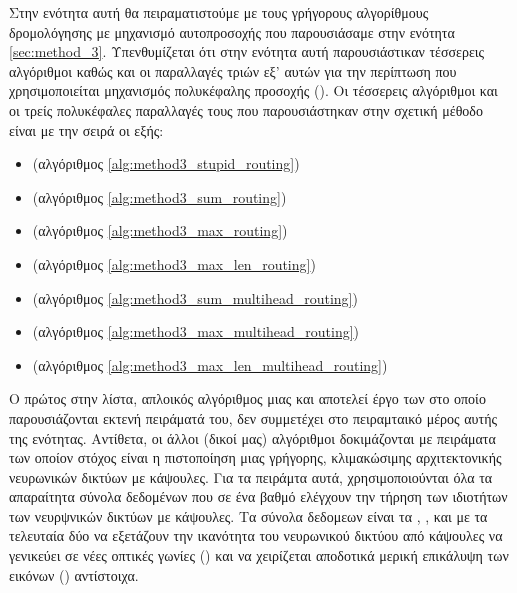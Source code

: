 Στην ενότητα αυτή θα πειραματιστούμε με τους γρήγορους αλγορίθμους δρομολόγησης με μηχανισμό αυτοπροσοχής που παρουσιάσαμε στην ενότητα \ref{sec:method_3}. Υπενθυμίζεται ότι στην ενότητα αυτή παρουσιάστικαν τέσσερεις αλγόριθμοι καθώς και οι παραλλαγές τριών εξ' αυτών για την περίπτωση που χρησιμοποιείται μηχανισμός πολυκέφαλης προσοχής (). Οι τέσσερεις αλγόριθμοι και οι τρείς πολυκέφαλες παραλλαγές τους που παρουσιάστηκαν στην σχετική μέθοδο είναι με την σειρά οι εξής: 
\begin{itemize}
    \item {} (αλγόριθμος \ref{alg:method3_stupid_routing})
    \item {} (αλγόριθμος \ref{alg:method3_sum_routing})
    \item {} (αλγόριθμος \ref{alg:method3_max_routing})
    \item {} (αλγόριθμος \ref{alg:method3_max_len_routing})
    \item {} (αλγόριθμος \ref{alg:method3_sum_multihead_routing})
    \item {} (αλγόριθμος \ref{alg:method3_max_multihead_routing})
    \item {} (αλγόριθμος \ref{alg:method3_max_len_multihead_routing})
\end{itemize}

Ο πρώτος στην λίστα, απλοικός αλγόριθμος μιας και αποτελεί έργο των \cite{mazzia2021efficient} στο οποίο παρουσιάζονται εκτενή πειράματά του, δεν συμμετέχει στο πειραμταικό μέρος αυτής της ενότητας. Αντίθετα, οι άλλοι (δικοί μας) αλγόριθμοι δοκιμάζονται με πειράματα των οποίον στόχος είναι η πιστοποίηση μιας γρήγορης, κλιμακώσιμης αρχιτεκτονικής νευρωνικών δικτύων με κάψουλες. Για τα πειράμτα αυτά, χρησιμοποιούνται όλα τα απαραίτητα σύνολα δεδομένων που σε ένα βαθμό ελέγχουν την τήρηση των ιδιοτήτων των νευρψνικών δικτύων με κάψουλες. Τα σύνολα δεδομεων είναι τα , ,  και  με τα τελευταία δύο να εξετάζουν την ικανότητα του νευρωνικού δικτύου από κάψουλες να γενικεύει σε νέες οπτικές γωνίες () και να χειρίζεται αποδοτικά μερική επικάλυψη των εικόνων () αντίστοιχα.\par

